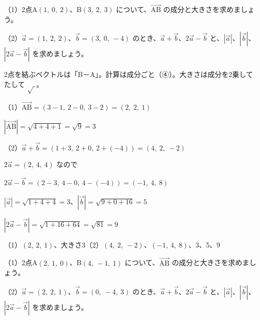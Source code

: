\begin{reidai}[3次元のベクトルの計算]
（1）2点A$(1,\ 0,\ 2)$、B$(3,\ 2,\ 3)$ について、$\overrightarrow{\mathrm{AB}}$ の成分と大きさを求めましょう。\par
（2）$\vec a=(1,\ 2,\ 2)$、$\vec b=(3,\ 0,\ -4)$ のとき、$\vec a+\vec b$、$2\vec a-\vec b$ と、$|\vec a|$、$|\vec b|$、$|2\vec a-\vec b|$ を求めましょう。\par
\kangaekata 2点を結ぶベクトルは「B－A」。計算は成分ごと（④）。大きさは成分を2乗してたして $\sqrt{\ }$。\par
\shiki（1）$\overrightarrow{\mathrm{AB}}=(3-1,\ 2-0,\ 3-2)=(2,\ 2,\ 1)$\par
\hspace*{4.6\zw}$|\overrightarrow{\mathrm{AB}}|=\sqrt{4+4+1}=\sqrt9=3$\par
\hspace*{2.6\zw}（2）$\vec a+\vec b=(1+3,\ 2+0,\ 2+(-4))=(4,\ 2,\ -2)$\par
\hspace*{4.6\zw}$2\vec a=(2,\ 4,\ 4)$ なので\par
\hspace*{4.6\zw}$2\vec a-\vec b=(2-3,\ 4-0,\ 4-(-4))=(-1,\ 4,\ 8)$\par
\hspace*{4.6\zw}$|\vec a|=\sqrt{1+4+4}=3$、\enspace $|\vec b|=\sqrt{9+0+16}=5$\par
\hspace*{4.6\zw}$|2\vec a-\vec b|=\sqrt{1+16+64}=\sqrt{81}=9$\par
\kotae （1）$(2,\ 2,\ 1)$、大きさ3\quad（2）$(4,\ 2,\ -2)$、$(-1,\ 4,\ 8)$、3、5、9
\end{reidai}

\begin{jibun}
（1）2点A$(2,\ 1,\ 0)$、B$(4,\ -1,\ 1)$ について、$\overrightarrow{\mathrm{AB}}$ の成分と大きさを求めましょう。\par
（2）$\vec a=(2,\ 2,\ 1)$、$\vec b=(0,\ -4,\ 3)$ のとき、$\vec a+\vec b$、$2\vec a-\vec b$ と、$|\vec a|$、$|\vec b|$、$|2\vec a-\vec b|$ を求めましょう。
\end{jibun}

